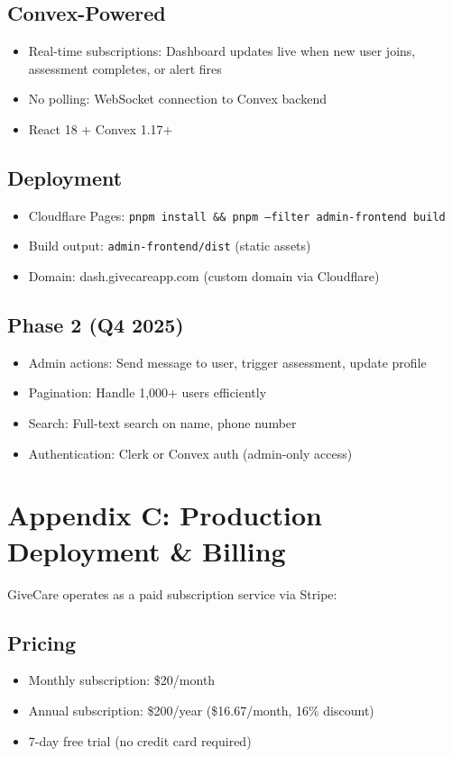 \documentclass{article}
\begin{document}
\subsection*{Convex-Powered}
\begin{itemize}
    \item Real-time subscriptions: Dashboard updates live when new user joins, assessment completes, or alert fires
    \item No polling: WebSocket connection to Convex backend
    \item React 18 + Convex 1.17+
\end{itemize}

\subsection*{Deployment}
\begin{itemize}
    \item Cloudflare Pages: \texttt{pnpm install \&\& pnpm --filter admin-frontend build}
    \item Build output: \texttt{admin-frontend/dist} (static assets)
    \item Domain: dash.givecareapp.com (custom domain via Cloudflare)
\end{itemize}

\subsection*{Phase 2 (Q4 2025)}
\begin{itemize}
    \item Admin actions: Send message to user, trigger assessment, update profile
    \item Pagination: Handle 1,000+ users efficiently
    \item Search: Full-text search on name, phone number
    \item Authentication: Clerk or Convex auth (admin-only access)
\end{itemize}
%
\section*{Appendix C: Production Deployment \& Billing}

GiveCare operates as a paid subscription service via Stripe:

\subsection*{Pricing}
\begin{itemize}
    \item Monthly subscription: \$20/month
    \item Annual subscription: \$200/year (\$16.67/month, 16\% discount)
    \item 7-day free trial (no credit card required)
\end{itemize}
\end{document}
